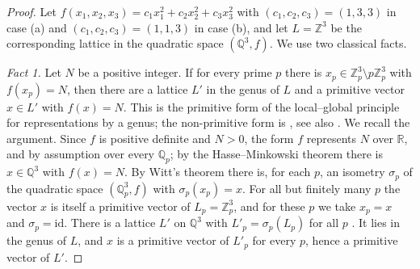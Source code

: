 \documentclass[11pt]{amsart}
\theoremstyle{definition}
\theoremstyle{remark}
\newcommand{\Z}{\mathbb{Z}}
\newcommand{\Q}{\mathbb{Q}}
\newcommand{\R}{\mathbb{R}}
\begin{document}
\begin{proof}
Let $f(x_1,x_2,x_3)=c_1x_1^2+c_2x_2^2+c_3x_3^2$ with $(c_1,c_2,c_3)=(1,3,3)$ in case (a) and $(c_1,c_2,c_3)=(1,1,3)$ in case (b),
and let $L=\Z^3$ be the corresponding lattice in the quadratic space $(\Q^3,f)$.
We use two classical facts.

\emph{Fact 1.} Let $N$ be a positive integer. If for every prime $p$ there is $x_p\in\Z_p^3\setminus p\Z_p^3$ with $f(x_p)=N$,
then there are a lattice $L'$ in the genus of $L$ and a primitive vector $x\in L'$ with $f(x)=N$.
This is the primitive form of the local--global principle for representations by a genus;
the non-primitive form is \cite[p.~129]{Cassels}, see also \cite[102:5]{OMeara}. We recall the argument.
Since $f$ is positive definite and $N>0$, the form $f$ represents $N$ over $\R$, and by assumption over every $\Q_p$;
by the Hasse--Minkowski theorem there is $x\in\Q^3$ with $f(x)=N$.
By Witt's theorem there is, for each $p$, an isometry $\sigma_p$ of the quadratic space $(\Q_p^3,f)$ with $\sigma_p(x_p)=x$.
For all but finitely many $p$ the vector $x$ is itself a primitive vector of $L_p=\Z_p^3$, and for these $p$ we take $x_p=x$ and $\sigma_p=\mathrm{id}$.
There is a lattice $L'$ on $\Q^3$ with $L'_p=\sigma_p(L_p)$ for all $p$ \cite[81:14]{OMeara}. It lies in the genus of $L$,
and $x$ is a primitive vector of $L'_p$ for every $p$, hence a primitive vector of $L'$.


\end{proof}
\end{document}
